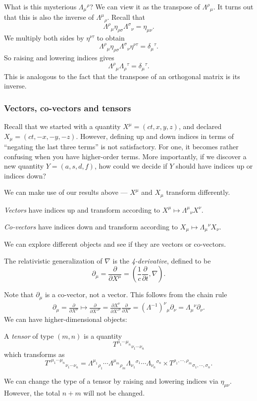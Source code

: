 \documentclass[a4paper]{article}
\begin{document}
What is this mysterious $\Lambda_\mu\!^\rho$? We can view it as the transpose of $\Lambda^\rho\!_\mu$. It turns out that this is also the inverse of $\Lambda^\mu\!_\rho$. Recall that
\[
  \Lambda^\rho\!_\mu\eta_{\rho\sigma} \Lambda^\sigma\!_\nu = \eta_{\mu\nu}.
\]
We multiply both sides by $\eta^{\nu\tau}$ to obtain
\[
  \Lambda^\rho\!_\mu\eta_{\rho\sigma} \Lambda^\sigma\!_\nu\eta^{\nu\tau} = \delta_\mu\!^\tau.
\]
So raising and lowering indices gives
\[
  \Lambda^\rho\!_\mu \Lambda_\rho\!^\tau = \delta_\mu\!^\tau.
\]
This is analogous to the fact that the transpose of an orthogonal matrix is its inverse.
\subsubsection{Vectors, co-vectors and tensors}
Recall that we started with a quantity $X^\mu = (ct, x, y, z)$, and declared $X_\mu = (ct, -x, -y, -z)$. However, defining up and down indices in terms of ``negating the last three terms'' is not satisfactory. For one, it becomes rather confusing when you have higher-order terms. More importantly, if we discover a new quantity $Y = (a, s, d, f)$, how could we decide if $Y$ should have indices up or indices down?

We can make use of our results above --- $X^\mu$ and $X_\mu$ transform differently.

\begin{defi}
  \emph{Vectors} have indices up and transform according to $X^\mu \mapsto \Lambda^\mu\!_\nu X^\nu$.

  \emph{Co-vectors} have indices down and transform according to $X_\mu \mapsto \Lambda_\mu\!^\nu X_\nu$.
\end{defi}

We can explore different objects and see if they are vectors or co-vectors.
\begin{defi}[4-derivative]
  The relativistic generalization of $\nabla$ is the \emph{4-derivative}, defined to be
  \[
    \partial_\mu = \frac{\partial}{\partial X^\mu} = \left(\frac{1}{c}\frac{\partial}{\partial t}, \nabla\right).
  \]
\end{defi}
Note that $\partial_\mu$ is a co-vector, not a vector. This follows from the chain rule
\begin{align*}
  \partial_\mu = \frac{\partial}{\partial X^\mu} \mapsto \frac{\partial}{\partial X'^\mu} = \frac{\partial X^\nu}{\partial X'^\mu}\frac{\partial}{\partial X^\nu} = (\Lambda^{-1})^\nu\!_\mu\partial_\nu = \Lambda_\mu\!^\nu \partial_\nu.
\end{align*}
We can have higher-dimensional objects:
\begin{defi}[Tensor]
  A \emph{tensor} of type $(m, n)$ is a quantity
  \[
    T^{\mu_1\cdots \mu_n}\!_{\nu_1\cdots \nu_n}
  \]
  which transforms as
  \[
    T'^{\mu_1\cdots \mu_n}\!_{\nu_1\cdots \nu_n} = \Lambda^{\mu_1}\!_{\rho_1} \cdots \Lambda^{\mu_m}\!_{\rho_m}\Lambda_{\nu_1}\!^{\sigma_1}\cdots\Lambda_{\nu_n}\!^{\sigma_n} \times T^{\rho_1, \cdots, \rho_m}\!_{\sigma_1, \cdots, \sigma_n}.
  \]
\end{defi}
We can change the type of a tensor by raising and lowering indices via $\eta_{\mu\nu}$. However, the total $n + m$ will not be changed.
\end{document}
